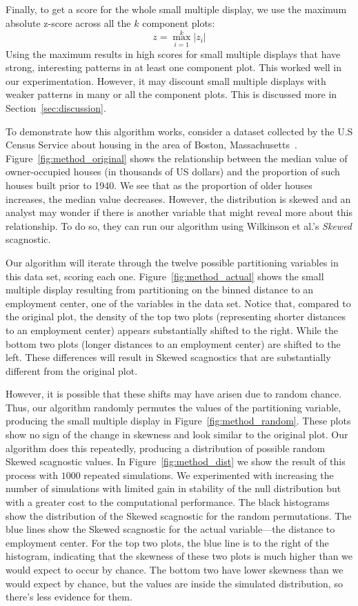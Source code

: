 Finally, to get a score for the whole small multiple display, we use the maximum absolute z-score across all the $k$ component plots: 
$$z = \max_{i=1}^k |z_i|$$
Using the maximum results in high scores for small multiple displays that have strong, interesting patterns in at least one component plot. This worked well in our experimentation. However, it may discount small multiple displays with weaker patterns in many or all the component plots. This is discussed more in Section~\ref{sec:discussion}. 

To demonstrate how this algorithm works, consider a dataset
collected by the U.S Census Service about housing in the area of Boston, Massachusetts~\cite{Harrison1978}. Figure~\ref{fig:method_original} shows the relationship between the median value of owner-occupied houses (in thousands of US dollars) and the proportion of such houses built prior to 1940. We see that as the proportion of older houses increases, the median value decreases. However, the distribution is skewed and an analyst may wonder if there is another variable that might reveal more about this relationship.
To do so, they can run our algorithm using Wilkinson et al.'s \emph{Skewed} scagnostic.

Our algorithm will iterate through the twelve possible partitioning variables in this data set, scoring each one. Figure~\ref{fig:method_actual} shows the small multiple display resulting from partitioning on the binned distance to an employment center, one of the variables in the data set. Notice that, compared to the original plot, the density of the top two plots (representing shorter distances to an employment center) appears substantially shifted to the right. While the bottom two plots (longer distances to an employment center) are shifted to the left. These differences will result in Skewed scagnostics that are substantially different from the original plot. 

However, it is possible that these shifts may have arisen due to random chance. Thus, our algorithm randomly permutes the values of the partitioning variable, producing the small multiple display in Figure~\ref{fig:method_random}. These plots show no sign of the change in skewness and look similar to the original plot. 
Our algorithm does this repeatedly, producing a distribution of possible random Skewed scagnostic values. In Figure~\ref{fig:method_dist} we show the result of this process with $1000$ repeated simulations. We experimented with increasing the number of simulations with limited gain in stability of the null distribution but with a greater cost to the computational performance. The black histograms show the distribution of the Skewed scagnostic for the random permutations. The blue lines show the Skewed scagnostic for the actual variable---the distance to employment center. For the top two plots, the blue line is to the right of the histogram, indicating that the skewness of these two plots is much higher than we would expect to occur by chance. The bottom two have lower skewness than we would expect by chance, but the values are inside the simulated distribution, so there's less evidence for them.

